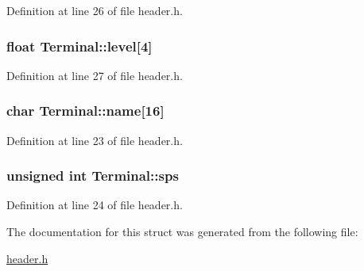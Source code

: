 Definition at line 26 of file header.h.\hypertarget{structTerminal_a0b8981c1518ca73a30d52c9947a69303}{
\subsubsection[{level}]{\setlength{\rightskip}{0pt plus 5cm}float {\bf Terminal::level}\mbox{[}4\mbox{]}}}
\label{structTerminal_a0b8981c1518ca73a30d52c9947a69303}


Definition at line 27 of file header.h.\hypertarget{structTerminal_a33735d179d26b1779c4c5523d839daec}{
\subsubsection[{name}]{\setlength{\rightskip}{0pt plus 5cm}char {\bf Terminal::name}\mbox{[}16\mbox{]}}}
\label{structTerminal_a33735d179d26b1779c4c5523d839daec}


Definition at line 23 of file header.h.\hypertarget{structTerminal_aa40fe0e25771a5cfb4d1b3ad89f579ce}{
\subsubsection[{sps}]{\setlength{\rightskip}{0pt plus 5cm}unsigned int {\bf Terminal::sps}}}
\label{structTerminal_aa40fe0e25771a5cfb4d1b3ad89f579ce}


Definition at line 24 of file header.h.

The documentation for this struct was generated from the following file:\begin{DoxyCompactItemize}
\item 
\hyperlink{header_8h}{header.h}\end{DoxyCompactItemize}
